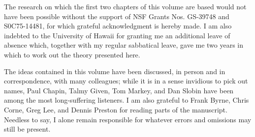 
The research on which the first two chapters of this volume are based would not have been possible without the support of NSF Grants Nos. GS-39748 and S0C75-14481, for which grateful acknowledgment is hereby made. I am also indebted to the University of Hawaii for granting me an additional leave of absence which, together with my regular sabbatical leave, gave me two years in which to work out the theory presented here.

The ideas contained in this volume have been discussed, in person and in correspondence, with many colleagues; while it is in a sense in\-vidious to pick out names, Paul Chapin, Talmy Given, Tom Markey, and Dan Slobin have been among the most long-suffering listeners. I am also grateful to Frank Byrne, Chris Corne, Greg Lee, and Dennis Pres\-ton for reading parts of the manuscript. Needless to say, I alone remain responsible for whatever errors and omissions may still be present.

